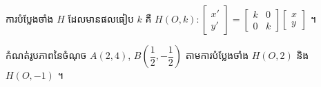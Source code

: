 \begin{formulaBox}[ជាទូទៅ]
ការបំប្លែងចាំង $H$ ដែលមានផលធៀប $k$ គឺ $H(O, k) : \begin{bmatrix} x'\\ y' \end{bmatrix} = \begin{bmatrix} k & 0\\ 0 & k \end{bmatrix}\begin{bmatrix} x\\ y \end{bmatrix}$ ។
\end{formulaBox}

\begin{example}[លំហាត់គំរូ]
កំណត់រូបភាពនៃចំណុច $A(2, 4)$, $B\left(\dfrac{1}{2}, -\dfrac{1}{2}\right)$ តាមការបំប្លែងចាំង $H(O, 2)$ និង $H(O, -1)$ ។
\end{example}
\ans
